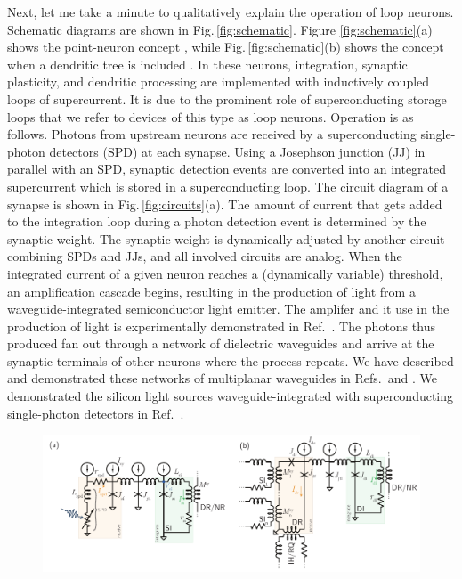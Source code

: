 \documentclass[]{article}
\newcommand{\onlinecite}[1]{\hspace{-1 ex} \nocite{#1}\citenum{#1}}
\begin{document}
Next, let me take a minute to qualitatively explain the operation of loop neurons. Schematic diagrams are shown in Fig.\,\ref{fig:schematic}. Figure \ref{fig:schematic}(a) shows the point-neuron concept \cite{sh2018,sh2019_jap}, while Fig.\,\ref{fig:schematic}(b) shows the concept when a dendritic tree is included \cite{sh2019_jstqe}. In these neurons, integration, synaptic plasticity, and dendritic processing are implemented with inductively coupled loops of supercurrent. It is due to the prominent role of superconducting storage loops that we refer to devices of this type as loop neurons. Operation is as follows. Photons from upstream neurons are received by a superconducting single-photon detectors (SPD) at each synapse. Using a Josephson junction (JJ) in parallel with an SPD, synaptic detection events are converted into an integrated supercurrent which is stored in a superconducting loop. The circuit diagram of a synapse is shown in Fig.\,\ref{fig:circuits}(a). The amount of current that gets added to the integration loop during a photon detection event is determined by the synaptic weight. The synaptic weight is dynamically adjusted by another circuit combining SPDs and JJs, and all involved circuits are analog. When the integrated current of a given neuron reaches a (dynamically variable) threshold, an amplification cascade begins, resulting in the production of light from a waveguide-integrated semiconductor light emitter. The amplifer and it use in the production of light is experimentally demonstrated in Ref.\,\onlinecite{mcve2019}. The photons thus produced fan out through a network of dielectric waveguides and arrive at the synaptic terminals of other neurons where the process repeats. We have described and demonstrated these networks of multiplanar waveguides in Refs.\,\onlinecite{chbu2017} and \onlinecite{chbu2018}. We demonstrated the silicon light sources waveguide-integrated with superconducting single-photon detectors in Ref.\,\onlinecite{buch2017}.

\begin{figure}
\centering
\includegraphics[width=17.2cm]{_02__circuits.pdf}
\end{figure}
\end{document}
